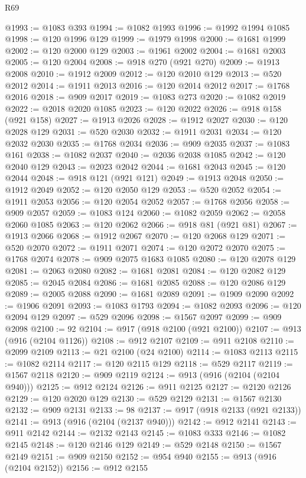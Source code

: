 \begin{lexlean}{R69}
\begin{coremodule}
@1993 := @1083 @393
@1994 := @1082 @1993
@1996 := @1992 @1994 @1085
@1998 := @120 @1996 @129
@1999 := @1979 @1998
@2000 := @1681 @1999
@2002 := @120 @2000 @129
@2003 := @1961 @2002
@2004 := @1681 @2003
@2005 := @120 @2004
@2008 := @918 @270 (@921 @270)
@2009 := @1913 @2008
@2010 := @1912 @2009
@2012 := @120 @2010 @129
@2013 := @520 @2012
@2014 := @1911 @2013
@2016 := @120 @2014 @2012
@2017 := @1768 @2016
@2018 := @909 @2017
@2019 := @1083 @273
@2020 := @1082 @2019
@2022 := @2018 @2020 @1085
@2023 := @120 @2022
@2026 := @918 @158 (@921 @158)
@2027 := @1913 @2026
@2028 := @1912 @2027
@2030 := @120 @2028 @129
@2031 := @520 @2030
@2032 := @1911 @2031
@2034 := @120 @2032 @2030
@2035 := @1768 @2034
@2036 := @909 @2035
@2037 := @1083 @161
@2038 := @1082 @2037
@2040 := @2036 @2038 @1085
@2042 := @120 @2040 @129
@2043 := @2023 @2042
@2044 := @1681 @2043
@2045 := @120 @2044
@2048 := @918 @121 (@921 @121)
@2049 := @1913 @2048
@2050 := @1912 @2049
@2052 := @120 @2050 @129
@2053 := @520 @2052
@2054 := @1911 @2053
@2056 := @120 @2054 @2052
@2057 := @1768 @2056
@2058 := @909 @2057
@2059 := @1083 @124
@2060 := @1082 @2059
@2062 := @2058 @2060 @1085
@2063 := @120 @2062
@2066 := @918 @81 (@921 @81)
@2067 := @1913 @2066
@2068 := @1912 @2067
@2070 := @120 @2068 @129
@2071 := @520 @2070
@2072 := @1911 @2071
@2074 := @120 @2072 @2070
@2075 := @1768 @2074
@2078 := @909 @2075 @1683 @1085
@2080 := @120 @2078 @129
@2081 := @2063 @2080
@2082 := @1681 @2081
@2084 := @120 @2082 @129
@2085 := @2045 @2084
@2086 := @1681 @2085
@2088 := @120 @2086 @129
@2089 := @2005 @2088
@2090 := @1681 @2089
@2091 := @1909 @2090
@2092 := @1906 @2091
@2093 := @1083 @1793
@2094 := @1082 @2093
@2096 := @120 @2094 @129
@2097 := @529 @2096
@2098 := @1567 @2097
@2099 := @909 @2098
@2100 := 92
@2104 := @917 (@918 @2100 (@921 @2100))
@2107 := @913 (@916 (@2104 @1126))
@2108 := @912 @2107
@2109 := @911 @2108
@2110 := @2099 @2109
@2113 := @21 @2100 (@24 @2100)
@2114 := @1083 @2113
@2115 := @1082 @2114
@2117 := @120 @2115 @129
@2118 := @529 @2117
@2119 := @1567 @2118
@2120 := @909 @2119
@2124 := @913 (@916 (@2104 (@2104 @940)))
@2125 := @912 @2124
@2126 := @911 @2125
@2127 := @2120 @2126
@2129 := @120 @2020 @129
@2130 := @529 @2129
@2131 := @1567 @2130
@2132 := @909 @2131
@2133 := 98
@2137 := @917 (@918 @2133 (@921 @2133))
@2141 := @913 (@916 (@2104 (@2137 @940)))
@2142 := @912 @2141
@2143 := @911 @2142
@2144 := @2132 @2143
@2145 := @1083 @333
@2146 := @1082 @2145
@2148 := @120 @2146 @129
@2149 := @529 @2148
@2150 := @1567 @2149
@2151 := @909 @2150
@2152 := @954 @940
@2155 := @913 (@916 (@2104 @2152))
@2156 := @912 @2155

\end{coremodule}
\end{lexlean}
